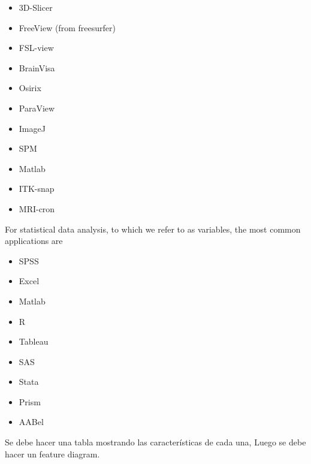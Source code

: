 \begin{itemize}
	\item 3D-Slicer
	\item FreeView (from freesurfer)
	\item FSL-view
	\item BrainVisa
	\item Osirix
	\item ParaView
	\item ImageJ
	\item SPM
	\item Matlab
	\item ITK-snap
	\item MRI-cron
\end{itemize}

For statistical data analysis, to which we refer to as variables, the most common applications are
\begin{itemize}
	\item SPSS
	\item Excel
	\item Matlab
	\item R
	\item Tableau
	\item SAS
	\item Stata
	\item Prism
	\item AABel
\end{itemize}

Se debe hacer una tabla mostrando las características de cada una,
Luego se debe hacer un feature diagram.